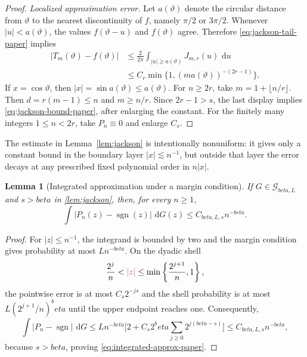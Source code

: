 \documentclass[11pt]{article}
\def\beta{beta}%
\newtheorem{lemma}[theorem]{Lemma}
\newcommand{\sgn}{\operatorname{sgn}}
\newcommand{\calG}{\mathcal G}
\newcommand{\dd}{\,\mathrm d}
\newcommand\aed[1]{{\color{magenta!60!black} #1}}
\newcommand\eed[1]{{\color{green!45!black} #1}}
\begin{document}
\begin{proof}
{\emph{Localized approximation error.}
Let $a(\vartheta)$ denote the circular distance from $\vartheta$ to the nearest discontinuity of $f$, namely $\pi/2$ or $3\pi/2$.  Whenever $|u|<a(\vartheta)$, the values $f(\vartheta-u)$ and $f(\vartheta)$ agree.  Therefore \eqref{eq:jackson-tail-paper} implies
\[
\begin{aligned}
|T_m(\vartheta)-f(\vartheta)|
&\le
\frac2{2\pi}\int_{|u|\ge a(\vartheta)}J_{m,r}(u)\,\dd u\\
&\le
C_r\min\{1,(m a(\vartheta))^{-(2r-1)}\}.
\end{aligned}
\]
If $x=\cos\vartheta$, then $|x|=\sin a(\vartheta)\le a(\vartheta)$.  For $n\ge2r$, take $m=1+\lfloor n/r\rfloor$.  Then $d=r(m-1)\le n$ and $m\ge n/r$.  Since $2r-1>s$, the last display implies \eqref{eq:jackson-bound-paper}, after enlarging the constant.  For the finitely many integers $1\le n<2r$, take $P_n\equiv0$ and enlarge $C_s$.}
\end{proof}

\eed{The estimate \aed{in Lemma~\ref{lem:jackson}} is intentionally nonuniform: it gives only a constant bound in the boundary layer $|x|\lesssim n^{-1}$, but outside that layer the error decays at any prescribed fixed polynomial order in $n|x|$.}

\begin{lemma}[Integrated approximation under a margin condition]
\label{lem:integrated-approx-paper}
If $G\in\calG_{\beta,L}$ and $s>\beta$ in \cref{lem:jackson}, then, for every $n\ge1$,
\begin{equation}
\label{eq:integrated-approx-paper}
\int|P_n(z)-\sgn(z)|\,\dd G(z)
\le C_{\beta,L,s}n^{-\beta}.
\end{equation}
\end{lemma}

\begin{proof}
\aed{For $|z|\le n^{-1}$},
 the integrand is bounded by two and the margin condition gives probability at most $Ln^{-\beta}$.  On the dyadic shell
\[
\frac{2^j}{n}<
\aed{|z|}
\le \min\left\{\frac{2^{j+1}}n,1\right\},
\]
the pointwise error is at most $C_s2^{-js}$ and the shell probability is at most $L(2^{j+1}/n)^\beta$ until the upper endpoint reaches one.  Consequently,
\[
\int|P_n-\sgn|\,\dd G
\le
Ln^{-\beta}
\biggl[2+C_s2^\beta\sum_{j\ge0}2^{j(\beta-s)}\biggr]
\le
C_{\beta,L,s}n^{-\beta},
\]
because $s>\beta$, proving \eqref{eq:integrated-approx-paper}.
\end{proof}
\end{document}
